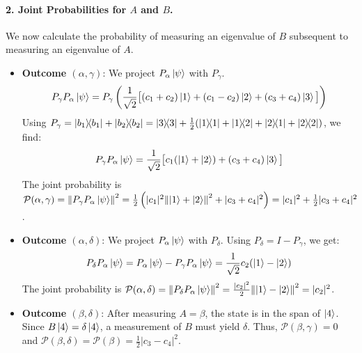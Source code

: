 \documentclass[11pt,a4paper]{article}
\begin{document}
\paragraph{2. Joint Probabilities for $A$ and $B$.}
We now calculate the probability of measuring an eigenvalue of $B$ subsequent to
measuring an eigenvalue of $A$.
\begin{itemize}
  \item \textbf{Outcome $(\alpha, \gamma)$}: We project $P_\alpha \ket{\psi}$
    with $P_\gamma$.
    $$ P_\gamma P_\alpha \ket{\psi} = P_\gamma \left( \frac{1}{\sqrt{2}} \big[
    (c_1+c_2)\ket{1} + (c_1-c_2)\ket{2} + (c_3+c_4)\ket{3} \big] \right) $$
    Using $P_\gamma = \dyad{b_1}{b_1}+\dyad{b_2}{b_2} = \dyad{3}{3} +
    \frac{1}{2}(\dyad{1}{1}+\dyad{1}{2}+\dyad{2}{1}+\dyad{2}{2})$, we find:
    $$ P_\gamma P_\alpha \ket{\psi} = \frac{1}{\sqrt{2}} \big[
    c_1(\ket{1}+\ket{2}) + (c_3+c_4)\ket{3} \big] $$
    The joint probability is $\mathcal{P}(\alpha, \gamma) = \norm{P_\gamma
    P_\alpha \ket{\psi}}^2 = \frac{1}{2}\left( |c_1|^2 \norm{\ket{1}+\ket{2}}^2
  + |c_3+c_4|^2 \right) = |c_1|^2 + \frac{1}{2}|c_3+c_4|^2$.

  \item \textbf{Outcome $(\alpha, \delta)$}: We project $P_\alpha \ket{\psi}$
    with $P_\delta$. Using $P_\delta = I - P_\gamma$, we get:
    $$ P_\delta P_\alpha \ket{\psi} = P_\alpha \ket{\psi} - P_\gamma P_\alpha
    \ket{\psi} = \frac{1}{\sqrt{2}} c_2(\ket{1}-\ket{2}) $$
    The joint probability is $\mathcal{P}(\alpha, \delta) = \norm{P_\delta
    P_\alpha \ket{\psi}}^2 = \frac{|c_2|^2}{2}\norm{\ket{1}-\ket{2}}^2 =
    |c_2|^2$.

  \item \textbf{Outcome $(\beta, \delta)$}: After measuring $A=\beta$, the state
    is in the span of $\ket{4}$. Since $B\ket{4}=\delta\ket{4}$, a measurement
    of $B$ must yield $\delta$. Thus, $\mathcal{P}(\beta, \gamma)=0$ and
    $\mathcal{P}(\beta, \delta) = \mathcal{P}(\beta) = \frac{1}{2}|c_3-c_4|^2$.
\end{itemize}
\end{document}
